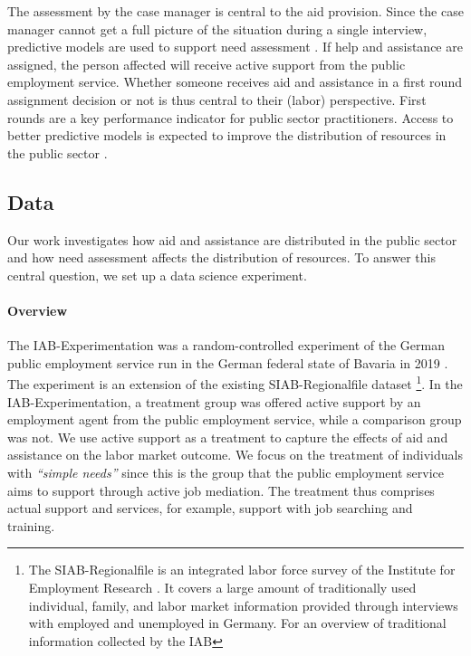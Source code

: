 \documentclass{article} %
\begin{document}
The assessment by the case manager is central to the aid provision. Since the case manager cannot get a full picture of the situation during a single interview, predictive models are used to support need assessment \citep{wirtz2019artificial}. If help and assistance are assigned, the person affected will receive active support from the public employment service. Whether someone receives aid and assistance in a first round assignment decision or not is thus central to their (labor) perspective. First rounds are a key performance indicator for public sector practitioners. Access to better predictive models is expected to improve the distribution of resources in the public sector \citep{blumenstock2016}.

\subsection{Data}
\label{sec:data_data}

Our work investigates how aid and assistance are distributed in the public sector and how need assessment affects the distribution of resources. To answer this central question, we set up a data science experiment.

\paragraph{Overview}
The IAB-Experimentation was a random-controlled experiment of the German public employment service run in the German federal state of Bavaria in 2019 \citep{athey2021policy}. The experiment is an extension of the existing SIAB-Regionalfile dataset \citep{siab2019, siab2019report}\footnote{The SIAB-Regionalfile is an integrated labor force survey of the Institute for Employment Research \citep{siab2019, siab2019report}. It covers a large amount of traditionally used individual, family, and labor market information provided through interviews with employed and unemployed in Germany. For an overview of traditional information collected by the IAB}. In the IAB-Experimentation, a treatment group was offered active support by an employment agent from the public employment service, while a comparison group was not. We use active support as a treatment to capture the effects of aid and assistance on the labor market outcome. We focus on the treatment of individuals with \emph{``simple needs''} since this is the group that the public employment service aims to support through active job mediation. The treatment thus comprises actual support and services, for example, support with job searching and training.
\end{document}
